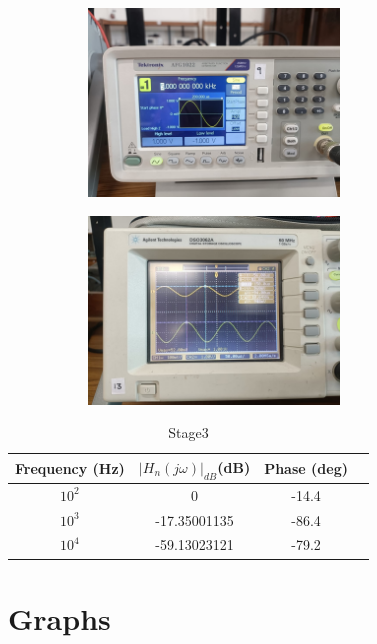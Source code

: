 \documentclass[a4paper,12pt]{article}
\begin{document}
\begin{figure}[H]
    \centering
    \begin{subfigure}{0.5\textwidth}
        \centering
        \includegraphics[height=5cm]{figs/Stage3/4000/para.jpeg}
    \end{subfigure}%
    \begin{subfigure}{0.5\textwidth}
        \centering
        \includegraphics[height=5cm]{figs/Stage3/4000/plot.jpeg}
    \end{subfigure}

    
\end{figure}

\begin{table}[H]
    \centering
    \begin{tabular}{|c|c|c|c|}
        \hline
        Frequency (Hz) &  $|H_n(j\omega)|_{dB}$(dB) & Phase (deg) \\
        \hline
        $10^2$ & 0 &-14.4 \\
        $10^3$ & -17.35001135 & -86.4 \\
        $10^4$ & -59.13023121& -79.2 \\
        \hline
    \end{tabular}
    \caption{Stage3}
\end{table}

\section*{Graphs}
\end{document}
